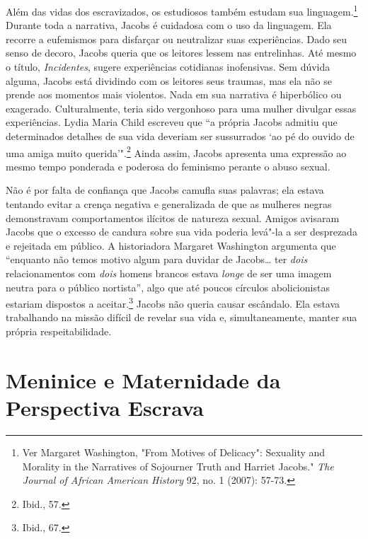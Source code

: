 Além das vidas dos escravizados, os estudiosos também estudam sua
linguagem.\footnote{Ver Margaret Washington, "From Motives of Delicacy":
  Sexuality and Morality in the Narratives of Sojourner Truth and
  Harriet Jacobs." \emph{The Journal of African American History} 92,
  no. 1 (2007): 57-73.} Durante toda a narrativa, Jacobs é cuidadosa com
o uso da linguagem. Ela recorre a eufemismos para disfarçar ou
neutralizar suas experiências. Dado seu senso de decoro, Jacobs queria
que os leitores lessem nas entrelinhas. Até mesmo o título,
\emph{Incidentes}, sugere experiências cotidianas inofensivas. Sem
dúvida alguma, Jacobs está dividindo com os leitores seus traumas, mas
ela não se prende aos momentos mais violentos. Nada em sua narrativa é
hiperbólico ou exagerado. Culturalmente, teria sido vergonhoso para uma
mulher divulgar essas experiências. Lydia Maria Child escreveu que ``a
própria Jacobs admitiu que determinados detalhes de sua vida deveriam
ser sussurrados `ao pé do ouvido de uma amiga muito
querida'".\footnote{Ibid., 57.} Ainda assim, Jacobs apresenta uma
expressão ao mesmo tempo ponderada e poderosa do feminismo perante o
abuso sexual.

Não é por falta de confiança que Jacobs camufla suas palavras; ela
estava tentando evitar a crença negativa e generalizada de que as
mulheres negras demonstravam comportamentos ilícitos de natureza sexual.
Amigos avisaram Jacobs que o excesso de candura sobre sua vida poderia
levá"-la a ser desprezada e rejeitada em público. A historiadora Margaret
Washington argumenta que ``enquanto não temos motivo algum para duvidar
de Jacobs\ldots{} ter \emph{dois} relacionamentos com \emph{dois} homens
brancos estava \emph{longe} de ser uma imagem neutra para o público
nortista'', algo que até poucos círculos abolicionistas estariam
dispostos a aceitar.\footnote{Ibid., 67.} Jacobs não queria causar
escândalo. Ela estava trabalhando na missão difícil de revelar sua vida
e, simultaneamente, manter sua própria respeitabilidade.

\section{Meninice e Maternidade da Perspectiva Escrava}

